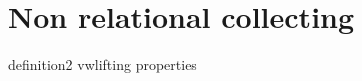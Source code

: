 \section{Non relational collecting}\label{sec:nonrelational}


{definition2}
{vwlifting}
{properties}

